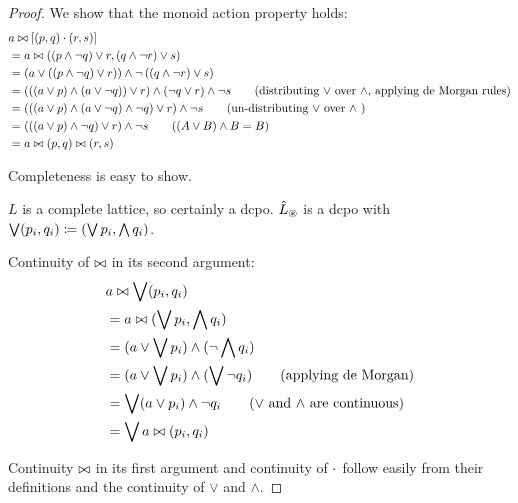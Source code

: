 \lsuperpose*
\begin{proof}
  \label{prf:lsuperpose}
  We show that the monoid action property holds:
  \begin{align*}
    &a \bowtie \left[(p, q) \cdot (r, s)\right]\\
    &= a \bowtie ((p \wedge \neg q) \vee r, (q \wedge \neg r) \vee s)\\
    &= \left(
      a \vee
      \left(
        \left(
          p \wedge \neg q
        \right)
        \vee r
      \right)
    \right)
    \wedge \neg
    \left(
      \left(
        q \wedge \neg r
      \right)
      \vee s
    \right)\\
    &= \left(
      \left(
        \left(
          a \vee p
        \right)
        \wedge
        \left(
          a \vee \neg q
        \right)
      \right)
      \vee r
    \right)
    \wedge
    \left(
      \neg q \vee r
    \right)
    \wedge
    \neg s
    \tag{distributing $\vee$ over $\wedge$, applying de Morgan rules}\\
    &= \left(
      \left(
        \left(
          a \vee p
        \right)
        \wedge
        \left(
          a \vee \neg q
        \right)
        \wedge
        \neg q
      \right)
      \vee r
    \right)
    \wedge
    \neg s
    \tag{un-distributing $\vee$ over $\wedge$ }\\
    &= \left(
      \left(
        \left(
          a \vee p
        \right)
        \wedge
        \neg q
      \right)
      \vee r
    \right)
    \wedge
    \neg s
    \tag{$(A \vee B) \wedge B = B$}\\
    &= a \bowtie (p, q) \bowtie (r, s)
  \end{align*}

  Completeness is easy to show.

  $L$ is a complete lattice, so certainly a dcpo. $\hat{L}_\circledast$ is a
  dcpo with $\bigvee (p_i, q_i) \coloneqq (\bigvee p_i, \bigwedge q_i)$.

  Continuity of $\bowtie$ in its second argument:
  \begin{align*}
    &a \bowtie \bigvee (p_i, q_i)\\
    &= a \bowtie (\bigvee p_i, \bigwedge q_i)\\
    &= (a \vee \bigvee p_i) \wedge (\neg \bigwedge q_i)\\
    &= (a \vee \bigvee p_i) \wedge (\bigvee \neg q_i) \tag{applying de Morgan}\\
    &= \bigvee (a \vee p_i) \wedge \neg q_i \tag{$\vee$ and $\wedge$ are continuous}\\
    &= \bigvee a \bowtie (p_i, q_i)
  \end{align*}

  Continuity $\bowtie$ in its first argument and continuity of $\cdot$ follow easily from their definitions and the continuity
  of $\vee$ and $\wedge$.
\end{proof}

